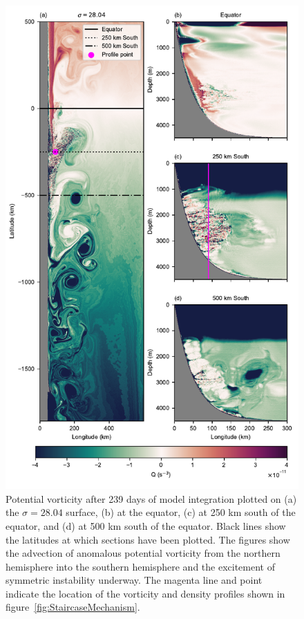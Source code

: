 \begin{figure}[hp]
    \centering
    \includegraphics{../figures/Figure4.pdf}
    \caption{Potential vorticity after 239 days of model integration plotted on (a) the $\sigma = 28.04$ surface, (b) at the equator, (c) at 250 km south of the equator, and (d) at 500 km south of the equator. Black lines show the latitudes at which sections have been plotted. The figures show the advection of anomalous potential vorticity from the northern hemisphere into the southern hemisphere and the excitement of symmetric instability underway. The magenta line and point indicate the location of the vorticity and density profiles shown in figure~\ref{fig:StaircaseMechanism}.}
    \label{fig:PV}
\end{figure}

